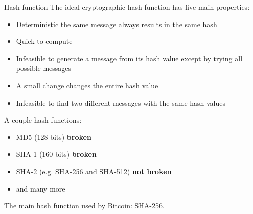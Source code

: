 \documentclass{beamer}
\begin{document}
\begin{frame}
    \begin{block}{Hash function}
        The ideal cryptographic hash function has five main properties:
        \begin{itemize}
            \item Deterministic the same message always results in the same hash
            \item Quick to compute
            \item Infeasible to generate a message from its hash value except by trying all possible messages
            \item A small change changes the entire hash value
            \item Infeasible to find two different messages with the same hash values
        \end{itemize}
    \end{block}
\end{frame}
\begin{frame}
    A couple hash functions:
    \begin{itemize}
        \item MD5 (128 bits) \pause \textbf{broken} \pause
        \item SHA-1 (160 bits) \pause \textbf{broken} \pause
        \item SHA-2 (e.g. SHA-256 and SHA-512) \pause \textbf{not broken} \pause
        \item and many more
    \end{itemize}
    \pause
    The main hash function used by Bitcoin: SHA-256.
\end{frame}
\end{document}
